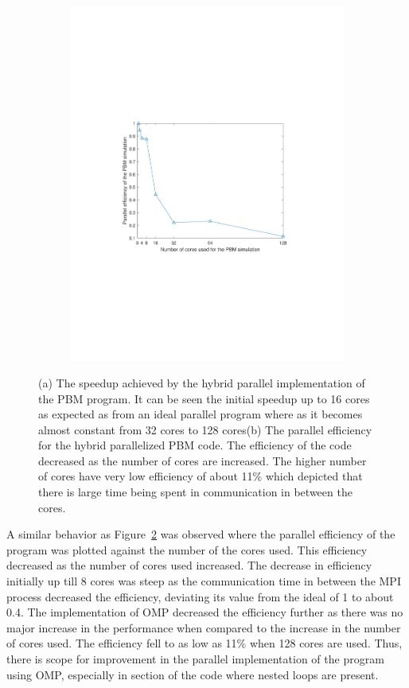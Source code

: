 \documentclass[preprint,11pt,authoryear]{elsarticle}
\begin{document}
\begin{figure}
\begin{subfigure}{.45\textwidth}
\includegraphics[scale=0.55]{rslsts_PBM_efficiency.pdf}
\caption{}
\label{fig:rslts_PBM_parallel_efficiency}
\end{subfigure}
\caption{(a) The speedup achieved by the hybrid parallel implementation of the PBM program. It can be 
seen the initial speedup up to 16 cores as expected as from an ideal parallel 
program where as it becomes almost constant from 32 cores to 128 cores(b) The parallel efficiency for 
the hybrid parallelized PBM code. The efficiency of the code decreased as the 
number of cores are increased. The higher number of cores have very low efficiency of about 11\% 
which depicted that there is large time being spent in communication in between the cores.}
\end{figure}     

A similar behavior as Figure~\ref{fig:rslts_PBM_parallel_efficiency} was observed where the parallel 
efficiency of the program was plotted against the number of the cores used. This efficiency 
decreased as the number of cores used increased. The decrease in efficiency initially up till 8 cores 
was steep as the communication time in between the MPI process decreased the efficiency, deviating 
its value from the ideal of 1 to about 0.4. The implementation of OMP decreased the efficiency further 
as there was no major increase in the performance when compared to the increase in the number 
of cores used. The efficiency fell to as low as 11\% when 128 cores are used. 
Thus, there is scope for improvement in the parallel implementation 
of the program using OMP, especially in section of the code where nested loops are present.
\end{document}
